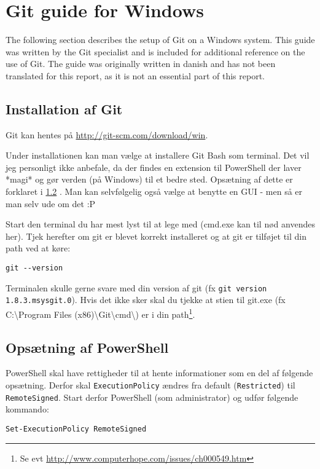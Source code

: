 \chapter{Git guide for Windows}
The following section describes the setup of Git on a Windows system.
This guide was written by the Git specialist and is included for additional reference on the use of Git.
The guide was originally written in danish and has not been translated for this report, as it is not an essential part of this report.
\section{Installation af Git}
Git kan hentes på \url{http://git-scm.com/download/win}.

Under installationen kan man vælge at installere Git Bash som terminal.
Det vil jeg personligt ikke anbefale, da der findes en extension til PowerShell der laver *magi* og gør verden (på Windows) til et bedre sted.
Opsætning af dette er forklaret i \ref{gitguide:powershell} .
Man kan selvfølgelig også vælge at benytte en GUI - men så er man selv ude om det :P

Start den terminal du har mest lyst til at lege med (cmd.exe kan til nød anvendes her).
Tjek herefter om git er blevet korrekt installeret og at git er tilføjet til din path ved at køre:
\begin{lstlisting}
git --version
\end{lstlisting}
Terminalen skulle gerne svare med din version af git (fx \texttt{git version 1.8.3.msysgit.0}).
Hvis det ikke sker skal du tjekke at stien til git.exe (fx C:\textbackslash{}Program Files (x86)\textbackslash{}Git\textbackslash{}cmd\textbackslash{}) er i din path\footnote{Se evt \url{http://www.computerhope.com/issues/ch000549.htm}}.

\section{Opsætning af PowerShell}\label{gitguide:powershell}

PowerShell skal have rettigheder til at hente informationer som en del af følgende opsætning.
Derfor skal \texttt{ExecutionPolicy} ændres fra default (\texttt{Restricted}) til \texttt{RemoteSigned}.
Start derfor PowerShell (som administrator) og udfør følgende kommando:
\begin{lstlisting}
Set-ExecutionPolicy RemoteSigned
\end{lstlisting}

